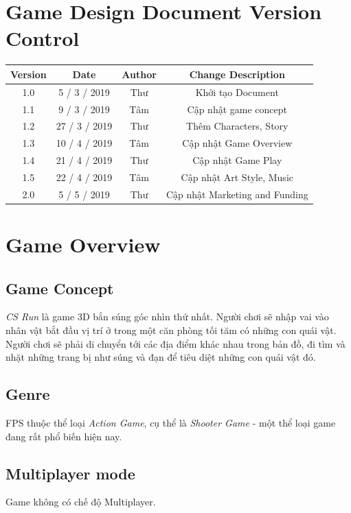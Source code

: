 \documentclass[14pt,a4paper]{extreport}
\begin{document}
\chapter*{Game Design Document Version Control}	
\begin{tabular}{|c|c|c|c|}
	\hline 
Version	& Date  & Author & Change Description \\ 
	\hline 
	 1.0 & 5 / 3 / 2019 & Thư & Khởi tạo Document \\ 
	\hline 
	1.1 & 9 / 3 / 2019 & Tâm &  Cập nhật game concept \\ 
	\hline 
	 1.2 & 27 / 3 / 2019 &Thư & Thêm Characters, Story \\ 
	\hline 
	 1.3 &10 / 4 / 2019  &Tâm & Cập nhật Game Overview \\ 
	\hline
	 1.4 &21 / 4 / 2019  &Thư & Cập nhật Game Play \\ 
	\hline
	 1.5 &22 / 4 / 2019  &Tâm & Cập nhật Art Style, Music \\ 
	\hline
	 2.0 &5 / 5 / 2019  &Thư & Cập nhật Marketing and Funding \\ 
	\hline  
\end{tabular} 
	
\tableofcontents 
\newpage
	
\chapter{Game Overview}
\section{Game Concept}
\textit{CS Run} là game 3D bắn súng góc nhìn thứ nhất. Người chơi sẽ nhập vai vào nhân vật bắt đầu vị trí ở trong một căn phòng tối tăm có những con quái vật. Người chơi sẽ phải di chuyển tới các địa điểm khác nhau trong bản đồ, đi tìm và nhặt những trang bị như súng và đạn để tiêu diệt những con quái vật đó. 


\section{Genre}
FPS thuộc thể loại \textit{Action Game}, cụ thể là \textit{Shooter Game} - một thể loại game đang rất phổ biến hiện nay.

\section{Multiplayer mode}
Game không có chế độ Multiplayer.
\end{document}
